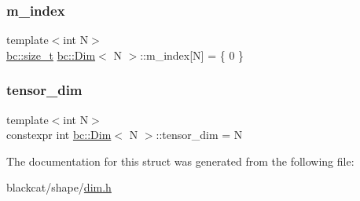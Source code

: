 \subsubsection{\texorpdfstring{m\+\_\+index}{m\_index}}
{\footnotesize\ttfamily template$<$int N$>$ \\
\hyperlink{namespacebc_aaf8e3fbf99b04b1b57c4f80c6f55d3c5}{bc\+::size\+\_\+t} \hyperlink{structbc_1_1Dim}{bc\+::\+Dim}$<$ N $>$\+::m\+\_\+index\mbox{[}N\mbox{]} = \{ 0 \}}

\mbox{\label{structbc_1_1Dim_a455eafab67c78cbb89905397f50c6824}} 
\subsubsection{\texorpdfstring{tensor\+\_\+dim}{tensor\_dim}}
{\footnotesize\ttfamily template$<$int N$>$ \\
constexpr int \hyperlink{structbc_1_1Dim}{bc\+::\+Dim}$<$ N $>$\+::tensor\+\_\+dim = N\hspace{0.3cm}{\ttfamily [static]}}



The documentation for this struct was generated from the following file\+:\begin{DoxyCompactItemize}
\item 
blackcat/shape/\hyperlink{dim_8h}{dim.\+h}\end{DoxyCompactItemize}
